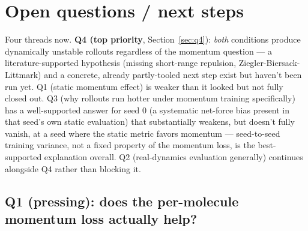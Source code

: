 \documentclass[11pt]{article}
\begin{document}
\section{Open questions / next steps}
\label{sec:next}

Four threads now. \textbf{Q4 (top priority}, Section~\ref{sec:q4}):
\emph{both} conditions produce dynamically unstable rollouts regardless of
the momentum question --- a literature-supported hypothesis (missing
short-range repulsion, Ziegler-Biersack-Littmark) and a concrete, already
partly-tooled next step exist but haven't been run yet. Q1 (static momentum
effect) is weaker than it looked but not fully closed out. Q3 (why rollouts
run hotter under momentum training specifically) has a well-supported answer
for seed 0 (a systematic net-force bias present in that seed's own static
evaluation) that substantially weakens, but doesn't fully vanish, at a seed
where the static metric favors momentum --- seed-to-seed training variance,
not a fixed property of the momentum loss, is the best-supported explanation
overall. Q2 (real-dynamics evaluation generally) continues alongside Q4
rather than blocking it.

\subsection{Q1 (pressing): does the per-molecule momentum loss actually help?}
\label{sec:q1}
\end{document}
